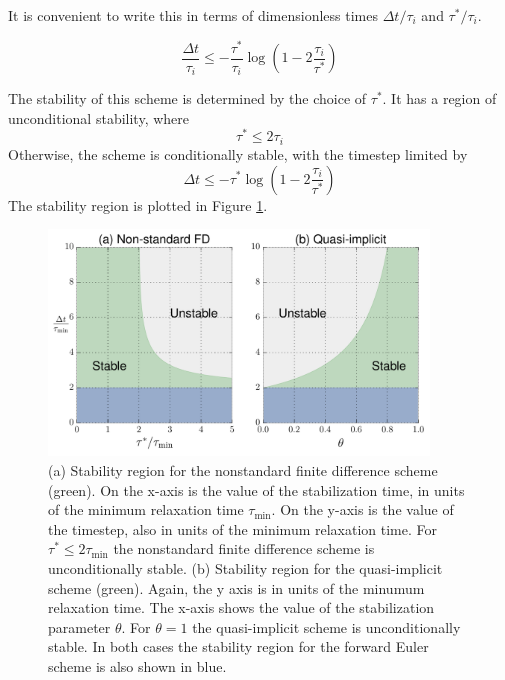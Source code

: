 \documentclass[preprint,12pt,authoryear]{elsarticle}
\begin{document}
It is convenient to write this in terms of dimensionless times $\Delta t/ \tau_i$ and $\tau^*/\tau_i$.

\begin{equation}
\frac{\Delta t}{\tau_i} \le -\frac{\tau^*}{\tau_i} \log \left(1 - 2 \frac{\tau_i}{\tau^*} \right)
\end{equation}

\fi

The stability of this scheme is determined by the choice of $\tau^*$.  
It has a region of unconditional stability, where
\begin{equation}
\tau^* \le 2 \tau_i
\end{equation}
Otherwise, the scheme is conditionally stable, with the timestep limited by 
\begin{equation}
\Delta t \le -\tau^* \log \left(1 - 2 \frac{\tau_i}{\tau^*} \right)
\end{equation}
The stability region is plotted in Figure \ref{fig:stability_region}. 

\begin{figure}
\includegraphics[width=0.9\textwidth]{figures/stability_region.pdf}
\caption{(a) Stability region for the nonstandard finite difference scheme (green). On the x-axis is the value of the stabilization time, in units of the minimum relaxation time $\tau_{\mathrm{min}}$.  On the y-axis is the value of the timestep, also in units of the minimum relaxation time. For $\tau^*\le 2 \tau_{\mathrm{min}}$ the nonstandard finite difference scheme is unconditionally stable.  (b) Stability region for the quasi-implicit scheme (green).  Again, the y axis is in units of the minumum relaxation time.  The x-axis shows the value of the stabilization parameter $\theta$. For $\theta = 1$ the quasi-implicit scheme is unconditionally stable. In both cases the stability region for the forward Euler scheme is also shown in blue.}
\label{fig:stability_region}
\end{figure}
\end{document}
